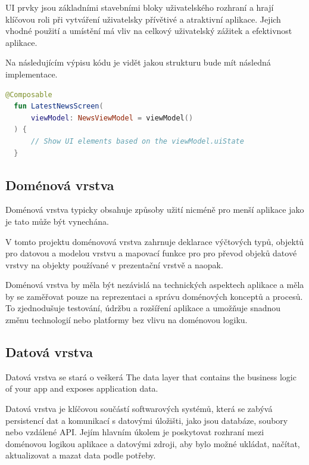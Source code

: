 UI prvky jsou základními stavebními bloky uživatelského rozhraní a hrají klíčovou roli při vytváření uživatelsky přívětivé a atraktivní aplikace. 
Jejich vhodné použití a umístění má vliv na celkový uživatelský zážitek a efektivnost aplikace.


\bigskip

Na následujícím výpisu kódu je vidět jakou strukturu bude mít následná implementace.

\begin{lstlisting}[caption={Popis UI widgetů pomocí jazyka Kotlin}, label={lst:ConsumeUIState}, language=Kotlin]
  @Composable
  fun LatestNewsScreen(
      viewModel: NewsViewModel = viewModel()
  ) {
      // Show UI elements based on the viewModel.uiState
  }
\end{lstlisting}

\subsection*{Doménová vrstva}
Doménová vrstva typicky obsahuje způsoby užití nicméně pro menší aplikace jako je tato může být vynechána. 

V tomto projektu doménovová vrstva zahrnuje deklarace výčtových typů, objektů pro datovou a modelou vrstvu a mapovací funkce pro pro převod
objeků datové vrstvy na objekty používané v prezentační vrstvě a naopak.

Doménová vrstva by měla být nezávislá na technických aspektech aplikace a měla by se zaměřovat pouze na reprezentaci a správu doménových
 konceptů a procesů. To zjednodušuje testování, údržbu a rozšíření aplikace a umožňuje snadnou změnu technologií nebo platformy bez 
 vlivu na doménovou logiku.

\subsection*{Datová vrstva}
Datová vrstva se stará o veškerá 
The data layer that contains the business logic of your app and exposes application data.


Datová vrstva je klíčovou součástí softwarových systémů, která se zabývá persistencí dat a komunikací s datovými úložišti, jako jsou
 databáze, soubory nebo vzdálené API. Jejím hlavním úkolem je poskytovat rozhraní mezi doménovou logikou aplikace a datovými zdroji, 
 aby bylo možné ukládat, načítat, aktualizovat a mazat data podle potřeby.



